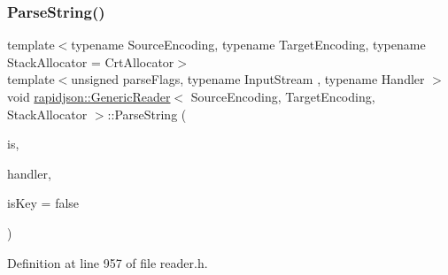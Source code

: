 \subsubsection{\texorpdfstring{ParseString()}{ParseString()}}
{\footnotesize\ttfamily template$<$typename Source\+Encoding, typename Target\+Encoding, typename Stack\+Allocator = Crt\+Allocator$>$ \\
template$<$unsigned parse\+Flags, typename Input\+Stream , typename Handler $>$ \\
void \mbox{\hyperlink{classrapidjson_1_1_generic_reader}{rapidjson\+::\+Generic\+Reader}}$<$ Source\+Encoding, Target\+Encoding, Stack\+Allocator $>$\+::Parse\+String (\begin{DoxyParamCaption}\item[{Input\+Stream \&}]{is,  }\item[{\mbox{\hyperlink{classrapidjson_1_1_handler}{Handler}} \&}]{handler,  }\item[{bool}]{is\+Key = {\ttfamily false} }\end{DoxyParamCaption})\hspace{0.3cm}{\ttfamily [private]}}



Definition at line 957 of file reader.\+h.


